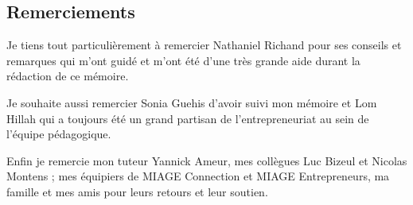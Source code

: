 \begin{center}
\subsection*{Remerciements}
\end{center}

\hskip7mm

\begin{spacing}{1.3}
Je tiens tout particulièrement à remercier Nathaniel {Richand} pour ses conseils et remarques qui m'ont guidé et m'ont été d'une très grande aide durant la rédaction de ce mémoire.

Je souhaite aussi remercier Sonia Guehis d'avoir suivi mon mémoire et Lom Hillah qui a toujours été un grand partisan de l'entrepreneuriat au sein de l'équipe pédagogique.

Enfin je remercie mon tuteur Yannick Ameur, mes collègues Luc Bizeul et Nicolas Montens ; mes équipiers de MIAGE Connection et MIAGE Entrepreneurs, ma famille et mes amis pour leurs retours et leur soutien. 
\end{spacing}